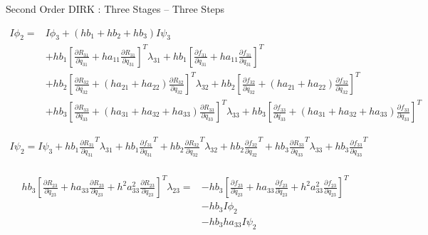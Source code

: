 \documentclass{beamer}
\newcommand{\pd}[2]{\frac{\partial #1}{\partial #2}}
\begin{document}
\begin{frame}[allowframebreaks]{Second Order DIRK : Three Stages -- Three Steps}
\framebreak

\begin{equation}
  \begin{split}
    I \phi_2 =  & I \phi_3 + (hb_1 + hb_2 + hb_3) I \psi_3  \\ 
    & + hb_1 \left[ \pd{R_{31}}{\dot{q}_{31}} + ha_{11} \pd{R_{31}}{q_{31}}  \right]^T \lambda_{31} + hb_1 \left[ \pd{f_{31}}{\dot{q}_{31}} + ha_{11} \pd{f_{31}}{{q}_{31}} \right]^T \\
    & + hb_2 \left[ \pd{R_{32}}{\dot{q_{32}}} + (ha_{21} + ha_{22}) \pd{R_{32}}{q_{32}} \right]^T \lambda_{32} + hb_2 \left[ \pd{f_{32}}{\dot{q_{32}}} + (ha_{21} + ha_{22}) \pd{f_{32}}{q_{32}} \right]^T \\               
    & + hb_3 \left[ \pd{R_{33}}{\dot{q_{33}}} + (ha_{31} + ha_{32} + ha_{33}) \pd{R_{33}}{q_{33}} \right]^T \lambda_{33} + hb_3 \left[ \pd{f_{33}}{\dot{q_{33}}} + (ha_{31} + ha_{32} + ha_{33}) \pd{f_{33}}{q_{33}} \right]^T
  \end{split}
\end{equation}

\begin{equation}
  \begin{split}
    I \psi_2 = I \psi_3 + hb_1 \pd{R_{31}}{q_{31}}^T \lambda_{31} + hb_1 \pd{f_{31}}{q_{31}}^T + hb_2 \pd{R_{32}}{q_{32}}^T \lambda_{32} + hb_2 \pd{f_{32}}{q_{32}}^T + hb_3 \pd{R_{33}}{q_{33}}^T \lambda_{33} + hb_3 \pd{f_{33}}{q_{33}}^T \\
  \end{split}
\end{equation}

\begin{equation}
  \begin{split}
    hb_3\left[\pd{R_{23}}{\ddot{q}_{23}} + ha_{33}\pd{R_{23}}{\dot{q}_{23}} + h^2a_{33}^2 \pd{R_{23}}{{q}_{23}} \right]^T \lambda_{23} = & - hb_3 \left[\pd{f_{23}}{\ddot{q}_{23}} + ha_{33}\pd{f_{23}}{\dot{q}_{23}} + h^2a_{33}^2 \pd{f_{23}}{{q}_{23}} \right]^T \\ 
    & - hb_3 I \phi_2 \\ 
    & - hb_3ha_{33} I  \psi_2
  \end{split}
\end{equation}


\end{frame}
\end{document}
